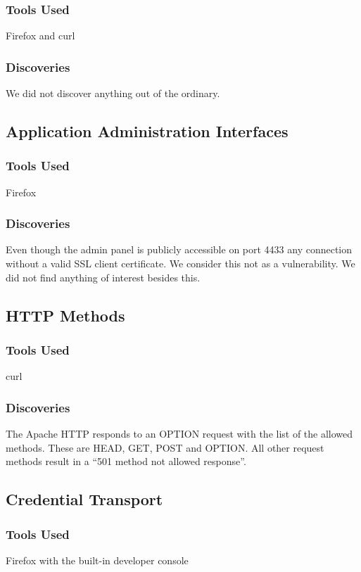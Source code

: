 \documentclass{article}
\begin{document}
\subsubsection{Tools Used}
Firefox and curl

\subsubsection{Discoveries}
We did not discover anything out of the ordinary.

\subsection{Application Administration Interfaces}
\subsubsection{Tools Used}
Firefox

\subsubsection{Discoveries}
Even though the admin panel is publicly accessible on port 4433 any connection without a valid SSL client certificate. We consider this not as a vulnerability.\newline
We did not find anything of interest besides this.


\subsection{HTTP Methods}
\subsubsection{Tools Used}
curl

\subsubsection{Discoveries}
The Apache HTTP responds to an OPTION request with the list of the allowed methods. These are HEAD, GET, POST and OPTION. All other request methods result in a ``501 method not allowed response''.

\subsection{Credential Transport}
\subsubsection{Tools Used}
Firefox with the built-in developer console
\end{document}
